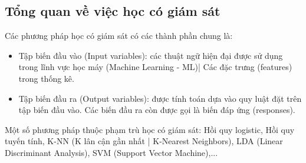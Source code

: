 \subsection{Tổng quan về việc học có giám sát}

Các phương pháp học có giám sát có các thành phần chung là:
\begin{itemize} [label=--]
	\item Tập biến đầu vào (Input variables): các thuật ngữ hiện đại được sử dụng trong lĩnh vực học máy (Machine Learning - ML)| Các đặc trưng (features) trong thống kê.
	\item Tập biến đầu ra (Output variables): được tính toán dựa vào quy luật đặt trên tập biến đầu vào. Các biến đầu ra còn được gọi là biến đáp ứng (responses).
\end{itemize}
Một số phương pháp thuộc phạm trù học có giám sát: Hồi quy logistic, Hồi quy tuyến tính,  K-NN (K lân cận gần nhất | K-Nearest Neighbors), LDA (Linear Discriminant Analysis), SVM (Support Vector Machine),...

